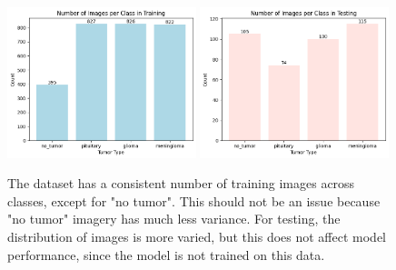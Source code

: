\documentclass[conference]{IEEEtran}
\begin{document}




\begin{figure}[!ht]
    \centering
    \includegraphics[width=0.49\textwidth]{ImagesPerClassTraining.png}
    \hfill
    \includegraphics[width=0.49\textwidth]{ImagesPerClassTesting.png}
    \caption{\large The dataset has a consistent number of training images across classes, except for "no tumor". This should not be an issue because "no tumor" imagery has much less variance. For testing, the distribution of images is more varied, but this does not affect model performance, since the model is not trained on this data.}
    \label{images-per-class}
\end{figure}
\end{document}
